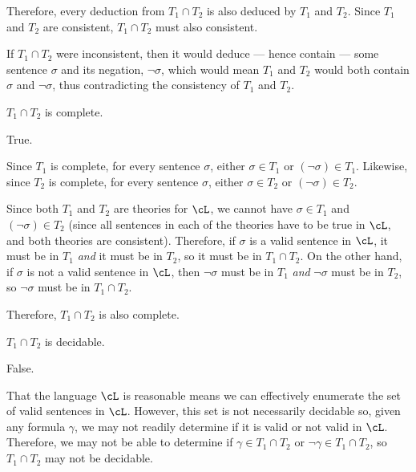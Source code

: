 \begin{problem}
\begin{enumalph}
\begin{enumroman}
\begin{Answer}
            Therefore, every deduction from $T_1 \cap T_2$ is also deduced
            by $T_1$ and $T_2$. Since $T_1$ and $T_2$ are consistent,
            $T_1 \cap T_2$ must also consistent.

            \step
            If $T_1 \cap T_2$ were inconsistent, then it would deduce
            --- hence contain --- some sentence $\sigma$ and its negation,
            $\lnot \sigma$, which would mean $T_1$ and $T_2$ would both
            contain $\sigma$ and $\lnot \sigma$, thus contradicting
            the consistency of $T_1$ and $T_2$.
          \end{Answer}
        \item $T_1 \cap T_2$ is complete.
          \begin{Answer}
            True.

            Since $T_1$ is complete, for every sentence $\sigma$,
            either $\sigma \in T_1$ or $(\lnot \sigma) \in T_1$.
            Likewise, since $T_2$ is complete, for every sentence $\sigma$,
            either $\sigma \in T_2$ or $(\lnot \sigma) \in T_2$.

            Since both $T_1$ and $T_2$ are theories for $\cL$,
            we cannot have $\sigma \in T_1$ and $(\lnot \sigma) \in T_2$
            (since all sentences in each of the theories have to be true in $\cL$,
            and both theories are consistent).
            Therefore, if $\sigma$ is a valid sentence in $\cL$,
            it must be in $T_1$ \emph{and} it must be in $T_2$,
            so it must be in $T_1 \cap T_2$.
            On the other hand, if $\sigma$ is not a valid sentence in $\cL$,
            then $\lnot \sigma$ must be in $T_1$ \emph{and}
            $\lnot \sigma$ must be in $T_2$, so $\lnot \sigma$ must be in
            $T_1 \cap T_2$.

            Therefore, $T_1 \cap T_2$ is also complete.
          \end{Answer}
        \newpage
        \item $T_1 \cap T_2$ is decidable.
          \begin{Answer}
            False.

            That the language $\cL$ is reasonable means we can effectively enumerate
            the set of valid sentences in $\cL$.
            However, this set is not necessarily decidable
            so, given any formula $\gamma$, we may not readily determine
            if it is valid or not valid in $\cL$. Therefore,
            we may not be able to determine if $\gamma \in T_1 \cap T_2$
            or $\lnot \gamma \in T_1 \cap T_2$,
            so $T_1 \cap T_2$ may not be decidable.
          \end{Answer}
      \end{enumroman}
  \end{enumalph}
\end{problem}
